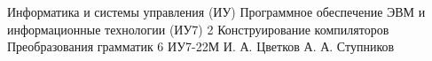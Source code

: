 \makereporttitle
{Информатика и системы управления (ИУ)}
{Программное обеспечение ЭВМ и информационные технологии (ИУ7)}
{2}
{Конструирование компиляторов}
{Преобразования грамматик}
{6}
{ИУ7-22М}
{И. А. Цветков}
{А. А. Ступников}
